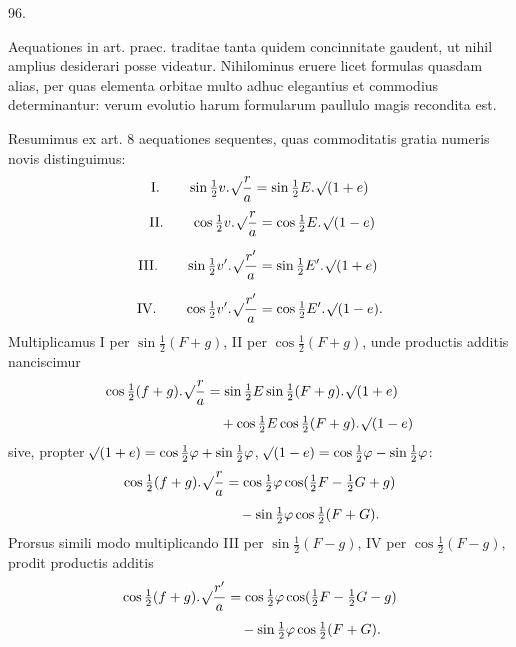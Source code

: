 \par{}\medskip
\hypertarget{native-130-article096}{}
\begin{center}96.\end{center}
Aequationes in art. praec. traditae tanta quidem concinnitate gaudent, ut nihil amplius desiderari posse videatur. Nihilominus eruere licet formulas quasdam alias, per quas elementa orbitae multo adhuc elegantius et commodius determinantur: verum evolutio harum formularum paullulo magis recondita est.

Resumimus ex art. 8 aequationes sequentes, quas commoditatis gratia numeris novis distinguimus:
\[
\mathrm{I.}\qquad \sin\tfrac12 v\mathpunct{.}\mathord{{}^{}\!\surd}\dfrac{r}{a}=\sin\tfrac12 E\mathpunct{.}\mathord{{}^{}\!\surd}(1+e)
\]
\[
\begin{aligned}
\mathrm{II.}\qquad \cos\tfrac12 v\mathpunct{.}\mathord{{}^{}\!\surd}\dfrac{r}{a}&=\cos\tfrac12 E\mathpunct{.}\mathord{{}^{}\!\surd}(1-e)\\[6pt]
\mathrm{III.}\qquad \sin\tfrac12 v'\mathpunct{.}\mathord{{}^{}\!\surd}\dfrac{r'}{a}&=\sin\tfrac12 E'\mathpunct{.}\mathord{{}^{}\!\surd}(1+e)\\[6pt]
\mathrm{IV.}\qquad \cos\tfrac12 v'\mathpunct{.}\mathord{{}^{}\!\surd}\dfrac{r'}{a}&=\cos\tfrac12 E'\mathpunct{.}\mathord{{}^{}\!\surd}(1-e).
\end{aligned}
\]
Multiplicamus I per $\sin\frac12(F+g)$, II per $\cos\frac12(F+g)$, unde productis additis nanciscimur
\[
\begin{aligned}
\cos\tfrac12(f+g)\mathpunct{.}\mathord{{}^{}\!\surd}\dfrac{r}{a}&=\sin\tfrac12 E\sin\tfrac12(F+g)\mathpunct{.}\mathord{{}^{}\!\surd}(1+e)\\[4pt]
&\quad+\cos\tfrac12 E\cos\tfrac12(F+g)\mathpunct{.}\mathord{{}^{}\!\surd}(1-e)
\end{aligned}
\]
sive, propter $\mathord{{}^{}\!\surd}(1+e)=\cos\frac12\varphi+\sin\frac12\varphi$, $\mathord{{}^{}\!\surd}(1-e)=\cos\frac12\varphi-\sin\frac12\varphi$:
\[
\begin{aligned}
\cos\tfrac12(f+g)\mathpunct{.}\mathord{{}^{}\!\surd}\dfrac{r}{a}&=\cos\tfrac12\varphi\cos(\tfrac12 F-\tfrac12 G+g)\\[4pt]
&\quad-\sin\tfrac12\varphi\cos\tfrac12(F+G).
\end{aligned}
\]
Prorsus simili modo multiplicando III per $\sin\frac12(F-g)$, IV per $\cos\frac12(F-g)$, prodit productis additis
\[
\begin{aligned}
\cos\tfrac12(f+g)\mathpunct{.}\mathord{{}^{}\!\surd}\dfrac{r'}{a}&=\cos\tfrac12\varphi\cos(\tfrac12 F-\tfrac12 G-g)\\[4pt]
&\quad-\sin\tfrac12\varphi\cos\tfrac12(F+G).
\end{aligned}
\]
